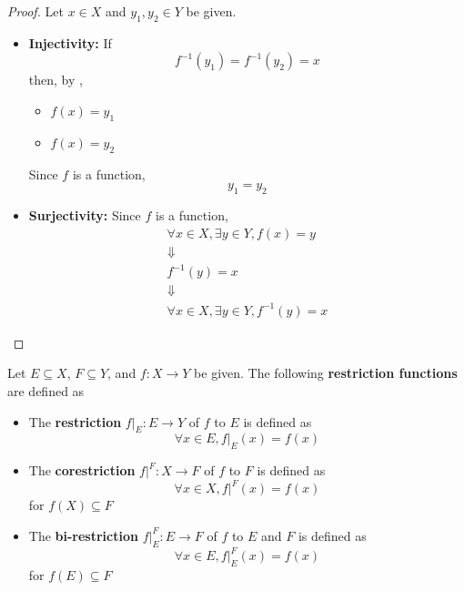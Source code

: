 \begin{proof}
    Let $x \in X$ and $y_{1}, y_{2} \in Y$ be given.
    \begin{itemize}
        \item \textbf{Injectivity:} If
        \[
        f^{-1}(y_{1}) = f^{-1}(y_{2}) = x
        \]
        then, by ,
        \begin{itemize}
            \item $f(x) = y_{1}$
            \item $f(x) = y_{2}$
        \end{itemize}
        Since $f$ is a function,
        \[
        y_{1} = y_{2}
        \]
        \item \textbf{Surjectivity:} Since $f$ is a function,
        \[
        \begin{array}{c}
            \forall x \in X, \exists y \in Y, f(x) = y \\
            \Downarrow \\
            f^{-1}(y) = x \\
            \Downarrow \\
            \forall x \in X, \exists y \in Y, f^{-1}(y) = x
        \end{array}
        \]
    \end{itemize}
\end{proof}

\bigskip

\begin{definition} \label{an:def:restriction-function}
    Let $E \subseteq X$, $F \subseteq Y$, and $f: X \to Y$ be given.
    The following \textbf{restriction functions} are defined as
    \begin{itemize}
        \item The \textbf{restriction} $f|_{E}: E \to Y$ of $f$ to $E$ is defined as
        \[
        \forall x \in E, f|_{E}(x) = f(x)
        \]
        \item The \textbf{corestriction} $f|^{F}: X \to F$ of $f$ to $F$ is defined as
        \[
        \forall x \in X, f|^{F}(x) = f(x)
        \]
        for $f(X) \subseteq F$
        \item The \textbf{bi-restriction} $f|_{E}^{F}: E \to F$ of $f$ to $E$ and $F$ is defined as
        \[
        \forall x \in E, f|_{E}^{F}(x) = f(x)
        \]
        for $f(E) \subseteq F$
    \end{itemize}
\end{definition}

